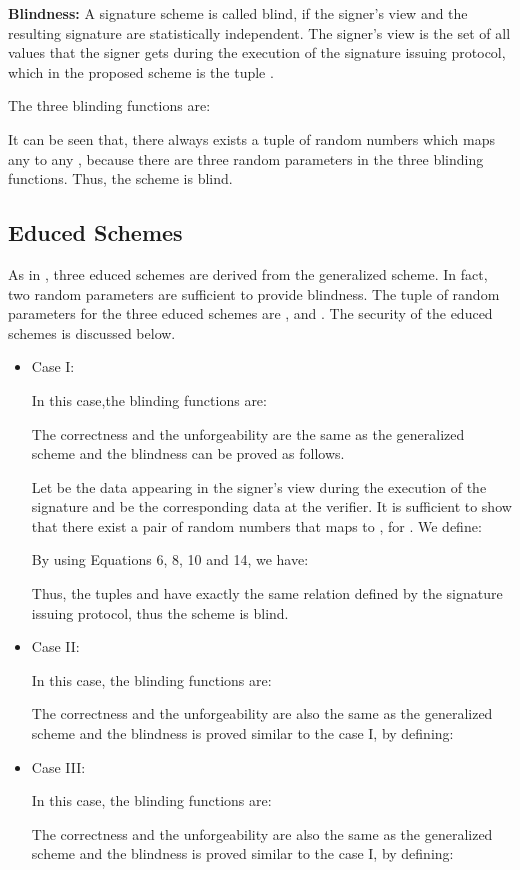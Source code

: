 \documentclass[journal,onecolumn,draftcls]{IEEEtran}
\begin{document}
\textbf{Blindness:} A signature scheme is called blind, if the signer's view and the resulting signature are statistically independent. The signer's view is the set of all values that the signer gets during the execution of the signature issuing protocol, which in the proposed scheme is the tuple .

The three blinding functions are:


It can be seen that, there always exists a tuple of random numbers  which maps any  to any , because there are three random parameters in the three blinding functions. Thus, the scheme is blind.

\subsection{Educed Schemes}
As in \cite{Huang}, three educed schemes are derived from the generalized scheme. In fact, two random parameters are sufficient to provide blindness. The tuple of random parameters  for the three educed schemes are ,  and . The security of the educed schemes is discussed below.

\begin{itemize}
	\item Case I: 
	
	In this case,the blinding functions are:
	
	
	The correctness and the unforgeability are the same as the generalized scheme and the blindness can be proved as follows.
	
	Let  be the data appearing in the signer's view during the execution of the signature and  be the corresponding data at the verifier. It is sufficient to show that there exist a pair of random numbers  that maps  to , for . We define:
	
By using Equations 6, 8, 10 and 14, we have:

Thus, the tuples  and  have exactly the same relation defined by the signature issuing protocol, thus the scheme is blind.

	\item Case II: 
	
	In this case, the blinding functions are:
	
	
	The correctness and the unforgeability are also the same as the generalized scheme and the blindness is proved similar to the case I, by defining:
	
	
	\item Case III: 
	
	In this case, the blinding functions are:
	
	
	The correctness and the unforgeability are also the same as the generalized scheme and the blindness is proved similar to the case I, by defining: 
	
\end{itemize}
\end{document}
